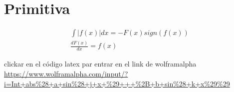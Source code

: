 
\section{Primitiva}

\begin{gather}
    \int |f(x)|dx = -F(x)sign(f(x)) \\
    \frac{dF(x)}{dx} = f(x) 
\end{gather}

clickar en el código latex par entrar en el link de wolframalpha
\url{https://www.wolframalpha.com/input/?i=Int+abs%28+a+sin%28+j+x+%29+++%2B+b+sin%28+k+x%29%29}